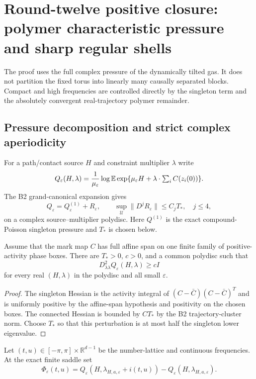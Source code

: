 \section{Round-twelve positive closure: polymer characteristic pressure and sharp regular shells}
\label{sec:r12-b1}

The proof uses the full complex pressure of the dynamically tilted gas.  It
does not partition the fixed torus into linearly many causally separated
blocks.  Compact and high frequencies are controlled directly by the
singleton term and the absolutely convergent real-trajectory polymer
remainder.

\subsection{Pressure decomposition and strict complex aperiodicity}

For a path/contact source $H$ and constraint multiplier $\lambda$ write
\[
 Q_\varepsilon(H,\lambda)
 ={1\over\mu_\varepsilon}
 \log\mathbb E\exp\{\mu_\varepsilon H+
                    \lambda\cdot\textstyle\sum_i C(z_i(0))\}.
\]
The B2 grand-canonical expansion gives
\[
 Q_\varepsilon=Q_\varepsilon^{(1)}+R_\varepsilon,
 \qquad
 \sup_{\mathcal U}\|D^jR_\varepsilon\|\le C_jT_*,\quad j\le4,
\]
on a complex source--multiplier polydisc.  Here $Q^{(1)}$ is the exact
compound-Poisson singleton pressure and $T_*$ is chosen below.

\begin{lemma}
\label{lem:r12-b1-covariance}
Assume that the mark map $C$ has full affine span on one finite family of
positive-activity phase boxes.  There are $T_*>0$, $c>0$, and a common
polydisc such that
\[
 D^2_{\lambda\lambda}Q_\varepsilon(H,\lambda)\ge cI
\]
for every real $(H,\lambda)$ in the polydisc and all small $\varepsilon$.
\end{lemma}

\begin{proof}
The singleton Hessian is the activity integral of
$(C-\bar C)(C-\bar C)^T$ and is uniformly positive by the affine-span
hypothesis and positivity on the chosen boxes.  The connected Hessian is
bounded by $CT_*$ by the B2 trajectory-cluster norm.  Choose $T_*$ so that
this perturbation is at most half the singleton lower eigenvalue.
\end{proof}

Let $(t,u)\in[-\pi,\pi]\times\mathbb R^{d-1}$ be the number-lattice and
continuous frequencies.  At the exact finite saddle set
\[
 \Phi_\varepsilon(t,u)=
 Q_\varepsilon(H,\lambda_{H,a,\varepsilon}+i(t,u))
 -Q_\varepsilon(H,\lambda_{H,a,\varepsilon}).
\]

